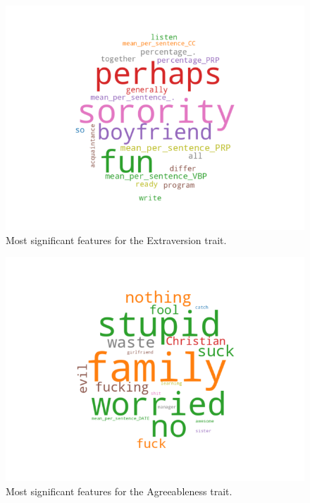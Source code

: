 \documentclass[10pt, a4paper]{article}
\begin{document}
\begin{figure}
\begin{center}
  \includegraphics[width=\columnwidth]{figures/cEXT.png}
  \caption{Most significant features for the Extraversion trait.}
  \label{fig:figure1}
\end{center}
\end{figure}

\begin{figure}
\begin{center}
  \includegraphics[width=\columnwidth]{figures/cAGR.png}
  \caption{Most significant features for the Agreeableness trait.}
  \label{fig:figure2}
\end{center}
\end{figure}
\end{document}
